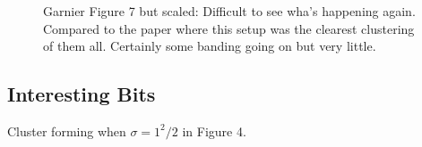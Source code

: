 \documentclass[11pt,a4paper, final, dvipsnames]{article}
\begin{document}
\begin{figure}
\begin{minipage}[b]{0.49\textwidth}
    \end{minipage}
    \caption{Garnier Figure 7 but scaled: Difficult to see wha's happening again. Compared to the paper where this setup was the clearest clustering of them all. Certainly some banding going on but very little.}
\end{figure}

\subsection{Interesting Bits}
Cluster forming when $\sigma =1^2/2$ in Figure 4.
\end{document}
